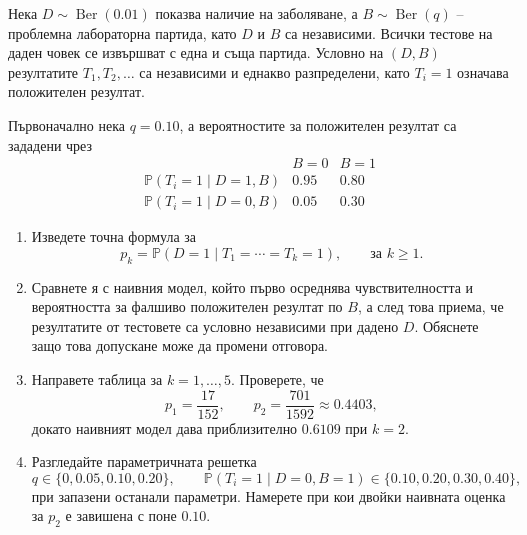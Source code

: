 \documentclass[11pt,a4paper]{article}
\newenvironment{enumeratea}{\begin{enumerate}[label=(\alph*),itemsep=0.28em,topsep=0.25em]}{\end{enumerate}}
\newcommand{\Pbb}{\mathbb P}
\newcommand{\Ber}{\operatorname{Ber}}
\begin{document}
\begin{researchtask}
Нека $D\sim\Ber(0.01)$ показва наличие на заболяване, а $B\sim\Ber(q)$ --
проблемна лабораторна партида, като $D$ и $B$ са независими.
Всички тестове на даден човек се извършват с една и съща партида.
Условно на $(D,B)$ резултатите $T_1,T_2,\dots$ са независими и еднакво
разпределени, като $T_i=1$ означава положителен резултат.

Първоначално нека $q=0.10$, а вероятностите за положителен резултат са
зададени чрез
\[
\begin{array}{c|cc}
 & B=0 & B=1\\ \hline
\Pbb(T_i=1\mid D=1,B) & 0.95 & 0.80\\
\Pbb(T_i=1\mid D=0,B) & 0.05 & 0.30
\end{array}
\]
\begin{enumeratea}
  \item Изведете точна формула за
  \[
  p_k=\Pbb(D=1\mid T_1=\cdots=T_k=1),
  \qquad
  \text{за }k\ge1.
  \]

  \item Сравнете я с наивния модел, който първо осреднява чувствителността
  и вероятността за фалшиво положителен резултат по $B$, а след това приема,
  че резултатите от тестовете са условно независими при дадено $D$.
  Обяснете защо това допускане може да промени отговора.

  \item Направете таблица за $k=1,\dots,5$. Проверете, че
  \[
  p_1=\frac{17}{152},
  \qquad
  p_2=\frac{701}{1592}\approx0.4403,
  \]
  докато наивният модел дава приблизително $0.6109$ при $k=2$.

  \item Разгледайте параметричната решетка
  \[
  q\in\{0,0.05,0.10,0.20\},
  \qquad
  \Pbb(T_i=1\mid D=0,B=1)\in\{0.10,0.20,0.30,0.40\},
  \]
  при запазени останали параметри. Намерете при кои двойки наивната оценка
  за $p_2$ е завишена с поне $0.10$.


\end{enumeratea}
\end{researchtask}
\end{document}

